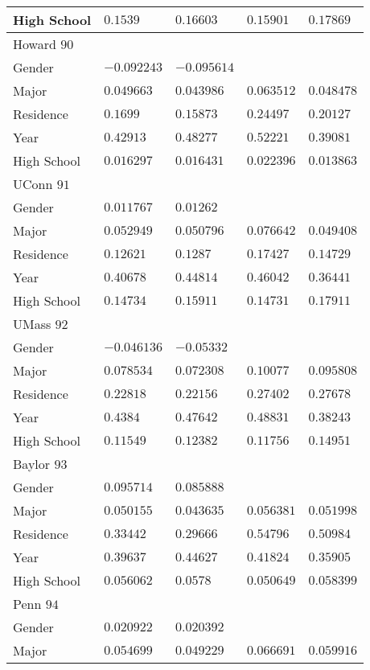 \begin{center}
\begin{longtable}{|l|l|l|l|l|}
High School & $0.1539$ & $0.16603$ & $0.15901$ & $0.17869$ \\ \hline \hline
Howard $90$ & & &   \\ \hline
Gender & $-0.092243$ & $-0.095614$ & & \\
Major & $0.049663$ & $0.043986$ & $0.063512$ & $0.048478$ \\
Residence & $0.1699$ & $0.15873$ & $0.24497$ & $0.20127$ \\
Year & $0.42913$ & $0.48277$ & $0.52221$ & $0.39081$ \\
High School & $0.016297$ & $0.016431$ & $0.022396$ & $0.013863$ \\ \hline \hline
UConn $91$ & & &   \\ \hline
Gender & $0.011767$ & $0.01262$ & & \\
Major & $0.052949$ & $0.050796$ & $0.076642$ & $0.049408$ \\
Residence & $0.12621$ & $0.1287$ & $0.17427$ & $0.14729$ \\
Year & $0.40678$ & $0.44814$ & $0.46042$ & $0.36441$ \\
High School & $0.14734$ & $0.15911$ & $0.14731$ & $0.17911$ \\ \hline \hline
UMass $92$ & & &   \\ \hline
Gender & $-0.046136$ & $-0.05332$ & & \\
Major & $0.078534$ & $0.072308$ & $0.10077$ & $0.095808$ \\
Residence & $0.22818$ & $0.22156$ & $0.27402$ & $0.27678$ \\
Year & $0.4384$ & $0.47642$ & $0.48831$ & $0.38243$ \\
High School & $0.11549$ & $0.12382$ & $0.11756$ & $0.14951$ \\ \hline \hline
Baylor $93$ & & &   \\ \hline
Gender & $0.095714$ & $0.085888$ & & \\
Major & $0.050155$ & $0.043635$ & $0.056381$ & $0.051998$ \\
Residence & $0.33442$ & $0.29666$ & $0.54796$ & $0.50984$ \\
Year & $0.39637$ & $0.44627$ & $0.41824$ & $0.35905$ \\
High School & $0.056062$ & $0.0578$ & $0.050649$ & $0.058399$ \\ \hline \hline
Penn $94$ & & &   \\ \hline
Gender & $0.020922$ & $0.020392$ & & \\
Major & $0.054699$ & $0.049229$ & $0.066691$ & $0.059916$ \\

\end{longtable}
\end{center}
